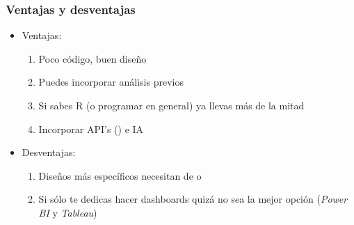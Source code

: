 \begin{frame}
    \frametitle{Ventajas y desventajas}
    \begin{itemize}
        \item<1-> Ventajas:
        \begin{enumerate}
            \item<2-> Poco código, buen diseño
            \item<3-> Puedes incorporar análisis previos
            \item<4-> Si sabes R (o programar en general) ya llevas más de la mitad
            \item<5-> Incorporar API's () e IA
        \end{enumerate}
        \item<6-> Desventajas:
        \begin{enumerate}
            \item<7-> Diseños más específicos necesitan de  o 
            \item<8-> Si sólo te dedicas hacer dashboards quizá no sea la mejor opción (\textit{Power BI} y \textit{Tableau})
        \end{enumerate}
  \end{itemize}
\end{frame}